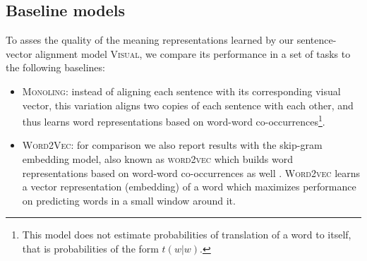 \subsection{Baseline models}
\label{sec:baseline}

To asses the quality of the meaning representations learned by our
sentence-vector alignment model \textsc{Visual}, we compare its
performance in a set of tasks to the following baselines:
\begin{itemize}
  \item \textsc{Monoling:} instead of aligning each sentence with its
    corresponding visual vector, this variation aligns two copies of
    each sentence with each other, and thus learns word
    representations based on word-word co-occurrences\footnote{This
      model does not estimate probabilities of translation of a word
      to itself, that is probabilities of the form $t(w|w)$.}.
  \item \textsc{Word2Vec:} for comparison we also report results with the skip-gram embedding model, also known as \textsc{word2vec} which builds word
    representations based on word-word co-occurrences as well
    \cite{mikolov2013efficient,mikolov2013distributed}. \textsc{Word2vec}
    learns a vector representation (embedding) of a word which
    maximizes performance on predicting words in a small window around
    it.
\end{itemize}
